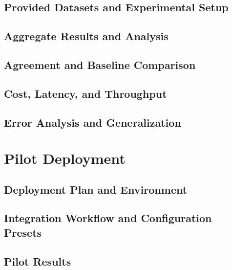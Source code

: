 \section{Provided Datasets and Experimental Setup}\label{sec:datasets}

\section{Aggregate Results and Analysis}\label{sec:results}

\section{Agreement and Baseline Comparison}\label{sec:agreement}

\section{Cost, Latency, and Throughput}\label{sec:cost}

\section{Error Analysis and Generalization}\label{sec:error}


\chapter{Pilot Deployment}\label{ch:pilot}

\section{Deployment Plan and Environment}\label{sec:deployment}
\section{Integration Workflow and Configuration Presets}\label{sec:integration}
\section{Pilot Results}\label{sec:pilot-results}
